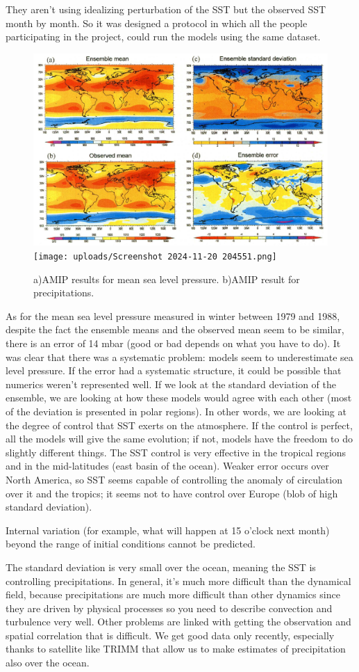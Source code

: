 They aren't using idealizing perturbation of the SST but the observed SST month by month. So it was designed a protocol in which all the people participating in the project, could run the models using the same dataset.
\begin{figure}[htp!]
	\centering
	\includegraphics[width=0.45\linewidth]{upload/Screenshot 2024-11-20 212548.png}\quad \texttt{[image: uploads/Screenshot 2024-11-20 204551.png]}
	\caption{a)AMIP results for mean sea level pressure. b)AMIP result for precipitations.}

\end{figure}
As for the mean sea level pressure measured in winter between 1979 and 1988, despite the fact the ensemble means and the observed mean seem to be similar, there is an error of 14 mbar (good or bad depends on what you have to do).
It was clear that there was a systematic problem: models seem to underestimate sea level pressure. If the error had a systematic structure, it could be possible that numerics weren't represented well.
If we look at the standard deviation of the ensemble, we are looking at how these models would agree with each other (most of the deviation is presented in polar regions). In other words, we are looking at the degree of control that SST exerts on the atmosphere. If the control is perfect, all the models will give the same evolution; if not, models have the freedom to do slightly different things.
The SST control is very effective in the tropical regions and in the mid-latitudes (east basin of the ocean). Weaker error occurs over North America, so SST seems capable of controlling the anomaly of circulation over it and the tropics; it seems not to have control over Europe (blob of high standard deviation).

Internal variation (for example, what will happen at 15 o'clock next month) beyond the range of initial conditions cannot be predicted.



The standard deviation is very small over the ocean, meaning the SST is controlling precipitations.
In general, it's much more difficult than the dynamical field, because precipitations are much more difficult than other dynamics since they are driven by physical processes so you need to describe convection and turbulence very well. Other problems are linked with getting the observation and spatial correlation that is difficult. We get good data only recently, especially thanks to satellite like TRIMM that allow us to make estimates of precipitation also over the ocean.


